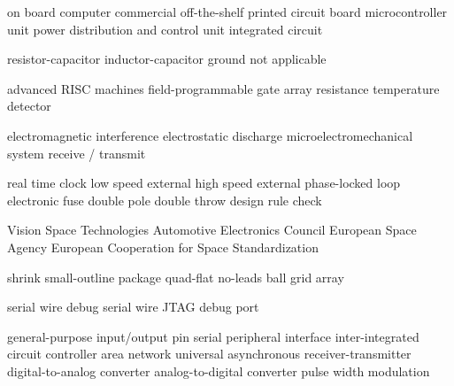      {on board computer}
    {commercial off-the-shelf}
     {printed circuit board}
     {microcontroller unit}
    {power distribution and control unit}
      {integrated circuit}

      {resistor-capacitor}
      {inductor-capacitor}
     {ground}
      {not applicable}

     {advanced RISC machines}
    {field-programmable gate array}
     {resistance temperature detector}

     {electromagnetic interference}
     {electrostatic discharge}
    {microelectromechanical system}
   {receive / transmit}

     {real time clock}
     {low speed external}
     {high speed external}
     {phase-locked loop}
   {electronic fuse}
    {double pole double throw}
     {design rule check}

     {Vision Space Technologies}
     {Automotive Electronics Council}
     {European Space Agency}
   {European Cooperation for Space Standardization}

    {shrink small-outline package}
     {quad-flat no-leads}
     {ball grid array}

     {serial wire debug}
  {serial wire JTAG debug port}

    {general-purpose input/output pin}
     {serial peripheral interface}
 {inter-integrated circuit}
     {controller area network}
    {universal asynchronous receiver-transmitter}
     {digital-to-analog converter}
     {analog-to-digital converter}
     {pulse width modulation}
